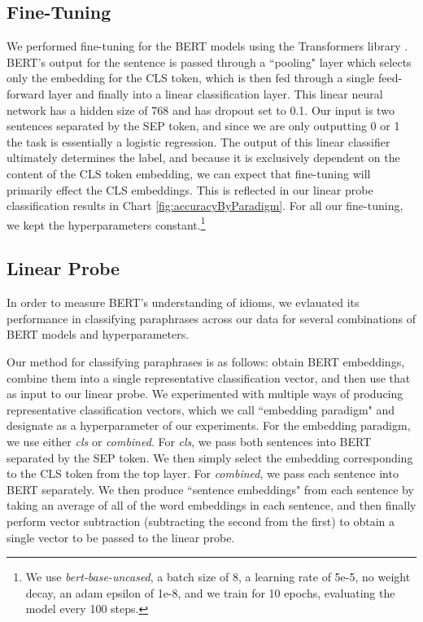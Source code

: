 \documentclass[11pt,a4paper]{article}
\begin{document}
\subsection{Fine-Tuning}

We performed fine-tuning for the BERT models using the Transformers library \cite{Wolf2019HuggingFacesTS}. BERT's output for the sentence is passed through a ``pooling" layer which selects only the embedding for the CLS token, which is then fed through a single feed-forward layer and finally into a linear classification layer. This linear neural network has a hidden size of 768 and has dropout set to 0.1. Our input is two sentences separated by the SEP token, and since we are only outputting 0 or 1 the task is essentially a logistic regression. The output of this linear classifier ultimately determines the label, and because it is exclusively dependent on the content of the CLS token embedding, we can expect that fine-tuning will primarily effect the CLS embeddings. This is reflected in our linear probe classification results in Chart \ref{fig:accuracyByParadigm}. For all our fine-tuning, we kept the hyperparameters constant.\footnote{We use \textit{bert-base-uncased}, a batch size of 8, a learning rate of 5e-5, no weight decay, an adam epsilon of 1e-8, and we train for 10 epochs, evaluating the model every 100 steps.}



\subsection{Linear Probe}

\noindent In order to measure BERT's understanding of idioms, we evlauated its performance in classifying paraphrases across our data for several combinations of BERT models and hyperparameters. 

Our method for classifying paraphrases is as follows: obtain BERT embeddings, combine them into a single representative classification vector, and then use that as input to our linear probe. We experimented with multiple ways of producing representative classification vectors, which we call ``embedding paradigm" and designate as a hyperparameter of our experiments. For the embedding paradigm, we use either \textit{cls} or \textit{combined}. For \textit{cls}, we pass both sentences into BERT separated by the SEP token. We then simply select the embedding corresponding to the CLS token from the top layer. For \textit{combined}, we pass each sentence into BERT separately. We then produce ``sentence embeddings" from each sentence by taking an average of all of the word embeddings in each sentence, and then finally perform vector subtraction (subtracting the second from the first) to obtain a single vector to be passed to the linear probe. 
\end{document}
